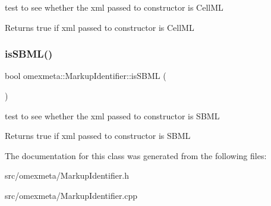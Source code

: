 test to see whether the xml passed to constructor is Cell\+ML 

\begin{DoxyReturn}{Returns}
true if xml passed to constructor is Cell\+ML 
\end{DoxyReturn}
\mbox{\label{classomexmeta_1_1MarkupIdentifier_a541ffd197ce109e20112923d7fc0641b}} 
\subsubsection{\texorpdfstring{is\+S\+B\+M\+L()}{isSBML()}}
{\footnotesize\ttfamily bool omexmeta\+::\+Markup\+Identifier\+::is\+S\+B\+ML (\begin{DoxyParamCaption}{ }\end{DoxyParamCaption})}



test to see whether the xml passed to constructor is S\+B\+ML 

\begin{DoxyReturn}{Returns}
true if xml passed to constructor is S\+B\+ML 
\end{DoxyReturn}


The documentation for this class was generated from the following files\+:\begin{DoxyCompactItemize}
\item 
src/omexmeta/Markup\+Identifier.\+h\item 
src/omexmeta/Markup\+Identifier.\+cpp\end{DoxyCompactItemize}

